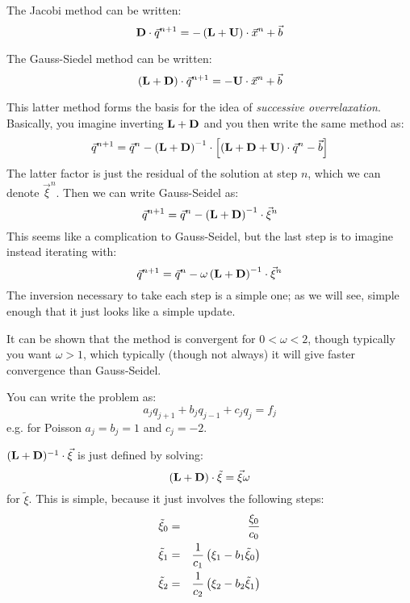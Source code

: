 The Jacobi method can be written:
\begin{equation}
{\bf D}\cdot\vec{q}^{n+1} = - \left({\bf L}
+ {\bf U}\right) \cdot \vec{x}^n + \vec{b}
\end{equation}

The Gauss-Siedel method can be written:
\begin{equation}
\left({\bf L} + {\bf D}\right)\cdot\vec{q}^{n+1}
= - {\bf U}\cdot \vec{x}^n + \vec{b}
\end{equation}

This latter method forms the basis for the idea of {\it successive
overrelaxation}. Basically, you imagine inverting ${\bf L}+{\bf D}$
and you then write the same method as:
\begin{equation}
\vec{q}^{n+1} = \vec{q}^n
- \left({\bf L}+{\bf D}\right)^{-1}\cdot \left[
\left({\bf L}+{\bf D}+{\bf U}\right)\cdot\vec{q}^n - \vec{b}\right]
\end{equation}
The latter factor is just the residual of the solution at step $n$,
which we can denote $\vec{\xi}^n$. Then we can write Gauss-Seidel as:
\begin{equation}
\vec{q}^{n+1} = \vec{q}^n
- \left({\bf L}+{\bf D}\right)^{-1}\cdot \vec{\xi}^n
\end{equation}
This seems like a complication to Gauss-Seidel, but the last step is
to imagine instead iterating with:
\begin{equation}
\vec{q}^{n+1} = \vec{q}^n - \omega
\left({\bf L}+{\bf D}\right)^{-1}\cdot \vec{\xi}^n
\end{equation}
The inversion necessary to take each step is a simple one; as we will
see, simple enough that it just looks like a simple update.

It can be shown that the method is convergent for $0<\omega<2$, though
typically you want $\omega>1$, which typically (though not always) it
will give faster convergence than Gauss-Seidel.
 
You can write the problem as:
\begin{equation}
a_j q_{j+1} + b_j q_{j-1} + c_j q_j = f_j
\end{equation}
e.g. for Poisson $a_j=b_j =1$ and $c_j=-2$. 

$({\bf L}+{\bf D})^{-1} \cdot \vec{\xi}$ is just defined by solving:
\begin{equation}
({\bf L} + {\bf D}) \cdot \tilde\xi = \vec{\xi} \omega
\end{equation}
for $\tilde\xi$. This is simple, because it just
involves the following steps:
\begin{eqnarray}
\tilde\xi_0 &=& \frac{\xi_0}{c_0} \cr
\tilde\xi_1 &=& \frac{1}{c_1} \left(\xi_1 - b_1 \tilde\xi_0\right)\cr
\tilde\xi_2 &=& \frac{1}{c_2} \left(\xi_2 - b_2 \tilde\xi_1\right)
\end{eqnarray}

